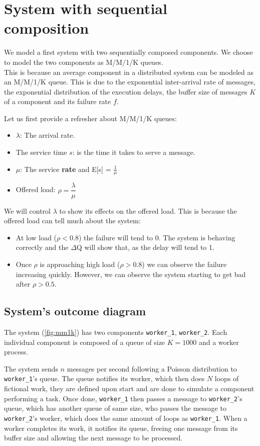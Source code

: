 \section{System with sequential composition}
    We model a first system with two sequentially composed components. We choose to model the two components as M/M/1/K queues. \\
    This is because an average component in a distributed system can be modeled as an M/M/1/K queue. This is due to the exponential inter-arrival rate of messages, the exponential distribution of the execution delays, the buffer size of messages $K$ of a component and its failure rate $f$. \cite{dq-tut}
    
    Let us first provide a refresher about M/M/1/K queues:
    \begin{itemize}
        \item $\lambda$: The arrival rate.
        \item The service time $s$: is the time it takes to serve a message.
        \item $\mu$: The service \textbf{rate} and E[s] = $\frac{1}{\mu}$
        \item Offered load: $\rho = \dfrac{\lambda}{\mu}$
    \end{itemize}

    We will control $\lambda$ to show its effects on the offered load. This is because the offered load can tell much about the system:
    \begin{itemize}
        \item At low load ($\rho < 0.8$) the failure will tend to 0. The system is behaving correctly and the $\Delta$Q will show that, as the delay will tend to 1.
        \item Once $\rho$ is approaching high load ($\rho > 0.8$) we can observe the failure increasing quickly. However, we can observe the system starting to get bad after $\rho > 0.5$. \cite{dq-tut}
    \end{itemize}
    
    \subsection{System's outcome diagram}
    The system (\cref{fig:mm1k}) has two components \texttt{worker\_1}, \texttt{worker\_2}. Each individual component is composed of a queue of size $K = 1000$ and a worker process.
    
    The system sends $n$ messages per second following a Poisson distribution to \texttt{worker\_1}'s queue. 
    The queue notifies its worker, which then does $N$ loops of fictional work, they are defined upon start and are done to simulate a component performing a task. Once done, \texttt{worker\_1} then passes a message to \texttt{worker\_2}'s queue, which has another queue of same size, who passes the message to \texttt{worker\_2}'s worker, which does the same amount of loops as \texttt{worker\_1}. When a worker completes its work, it notifies its queue, freeing one message from its buffer size and allowing the next message to be processed.
    

